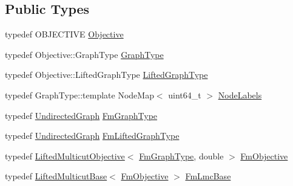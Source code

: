 \subsection*{Public Types}
\begin{DoxyCompactItemize}
\item 
typedef O\+B\+J\+E\+C\+T\+I\+V\+E \hyperlink{classnifty_1_1graph_1_1optimization_1_1lifted__multicut_1_1FusionMove_a83ed588b8a2f087185521b5fc73a61a1}{Objective}
\item 
typedef Objective\+::\+Graph\+Type \hyperlink{classnifty_1_1graph_1_1optimization_1_1lifted__multicut_1_1FusionMove_a9edb9ea8c942167e7cae35a33b337a51}{Graph\+Type}
\item 
typedef Objective\+::\+Lifted\+Graph\+Type \hyperlink{classnifty_1_1graph_1_1optimization_1_1lifted__multicut_1_1FusionMove_ad30c58a21dfc387883cd14c1da13554b}{Lifted\+Graph\+Type}
\item 
typedef Graph\+Type\+::template Node\+Map$<$ uint64\+\_\+t $>$ \hyperlink{classnifty_1_1graph_1_1optimization_1_1lifted__multicut_1_1FusionMove_af682848d662f2a0c22916e2c99de62d1}{Node\+Labels}
\item 
typedef \hyperlink{classnifty_1_1graph_1_1UndirectedGraph}{Undirected\+Graph} \hyperlink{classnifty_1_1graph_1_1optimization_1_1lifted__multicut_1_1FusionMove_a3f941b1058456bd110d5b3ca687774af}{Fm\+Graph\+Type}
\item 
typedef \hyperlink{classnifty_1_1graph_1_1UndirectedGraph}{Undirected\+Graph} \hyperlink{classnifty_1_1graph_1_1optimization_1_1lifted__multicut_1_1FusionMove_a1036b9c07018d8278e2d427cf00eac95}{Fm\+Lifted\+Graph\+Type}
\item 
typedef \hyperlink{classnifty_1_1graph_1_1optimization_1_1lifted__multicut_1_1LiftedMulticutObjective}{Lifted\+Multicut\+Objective}$<$ \hyperlink{classnifty_1_1graph_1_1optimization_1_1lifted__multicut_1_1FusionMove_a3f941b1058456bd110d5b3ca687774af}{Fm\+Graph\+Type}, double $>$ \hyperlink{classnifty_1_1graph_1_1optimization_1_1lifted__multicut_1_1FusionMove_af786783dbea6fdd23cf03d08dbe77419}{Fm\+Objective}
\item 
typedef \hyperlink{classnifty_1_1graph_1_1optimization_1_1lifted__multicut_1_1LiftedMulticutBase}{Lifted\+Multicut\+Base}$<$ \hyperlink{classnifty_1_1graph_1_1optimization_1_1lifted__multicut_1_1FusionMove_af786783dbea6fdd23cf03d08dbe77419}{Fm\+Objective} $>$ \hyperlink{classnifty_1_1graph_1_1optimization_1_1lifted__multicut_1_1FusionMove_a297573c2512b2c29c266affb3f77c8a8}{Fm\+Lmc\+Base}
\item 

\end{DoxyCompactItemize}

